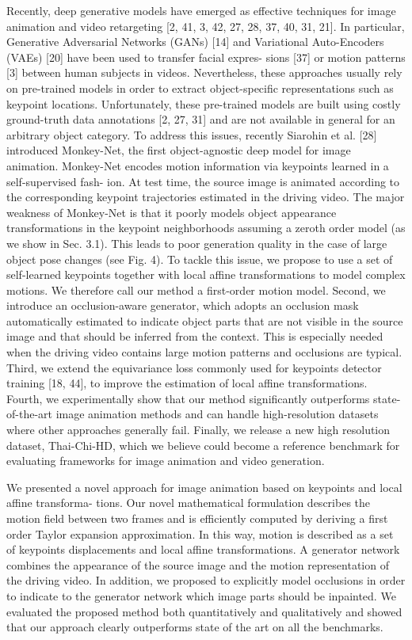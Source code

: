 \documentclass[english,12pt]{article}
\begin{document}
Recently, deep generative models have emerged as effective techniques for image animation and video
retargeting [2, 41, 3, 42, 27, 28, 37, 40, 31, 21]. In particular, Generative Adversarial Networks (GANs)
[14] and Variational Auto-Encoders (VAEs) [20] have been used to transfer facial expres- sions [37] or
motion patterns [3] between human subjects in videos. Nevertheless, these approaches usually rely on
pre-trained models in order to extract object-specific representations such as keypoint locations.
Unfortunately, these pre-trained models are built using costly ground-truth data annotations [2, 27, 31]
and are not available in general for an arbitrary object category. To address this issues, recently
Siarohin et al. [28] introduced Monkey-Net, the first object-agnostic deep model for image animation.
Monkey-Net encodes motion information via keypoints learned in a self-supervised fash- ion. At test time,
the source image is animated according to the corresponding keypoint trajectories estimated in the driving
video. The major weakness of Monkey-Net is that it poorly models object appearance transformations in the
keypoint neighborhoods assuming a zeroth order model (as we show in Sec. 3.1). This leads to poor generation
quality in the case of large object pose changes (see Fig. 4). To tackle this issue, we propose to use a
set of self-learned keypoints together with local affine transformations to model complex motions. We
therefore call our method a first-order motion model. Second, we introduce an occlusion-aware generator,
which adopts an occlusion mask automatically estimated to indicate object parts that are not visible in the
source image and that should be inferred from the context. This is especially needed when the driving video
contains large motion patterns and occlusions are typical. Third, we extend the equivariance loss commonly
used for keypoints detector training [18, 44], to improve the estimation of local affine transformations.
Fourth, we experimentally show that our method significantly outperforms state-of-the-art image animation
methods and can handle high-resolution datasets where other approaches generally fail. Finally, we release
a new high resolution dataset, Thai-Chi-HD, which we believe could become a reference benchmark for evaluating
frameworks for image animation and video generation.


We presented a novel approach for image animation based on keypoints and local affine transforma- tions. Our
novel mathematical formulation describes the motion field between two frames and is efficiently computed by
deriving a first order Taylor expansion approximation. In this way, motion is described as a set of keypoints
displacements and local affine transformations. A generator network combines the appearance of the source image
and the motion representation of the driving video. In addition, we proposed to explicitly model occlusions in
order to indicate to the generator network which image parts should be inpainted. We evaluated the proposed
method both quantitatively and qualitatively and showed that our approach clearly outperforms state of the art
on all the benchmarks.
\end{document}
